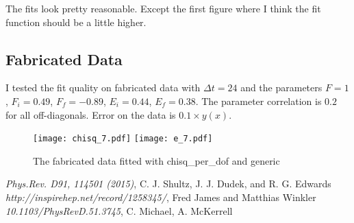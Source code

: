 \documentclass[10pt]{article}
\begin{document}

The fits look pretty reasonable. Except the first figure where I think the fit function should be a little higher.

\subsection{Fabricated Data}
I tested the fit quality on fabricated data with $\Delta t=24$ and the parameters $F = 1$, $F_i = 0.49$, $F_f = -0.89$, $E_i = 0.44$, $E_f = 0.38$. The parameter correlation is $0.2$ for all off-diagonals. Error on the data is $0.1\times y(x)$.
\par
\begin{figure}[htp]

\centering
\texttt{[image: chisq\_7.pdf]}\hfill
\texttt{[image: e\_7.pdf]}

\caption{The fabricated data fitted with  {\myfont chisq_per_dof and generic} }
\label{fig:figure7}


\end{figure}
\newpage
\begin{thebibliography}{9}

     \textit{Phys.Rev. D91, 114501 (2015)},         
       C. J. Shultz, J. J. Dudek, and R. G. Edwards       
     \textit{http://inspirehep.net/record/1258345/},         
       Fred James and Matthias Winkler   
     \textit{10.1103/PhysRevD.51.3745},         
       C. Michael, A. McKerrell   

\end{thebibliography}
\end{document}
